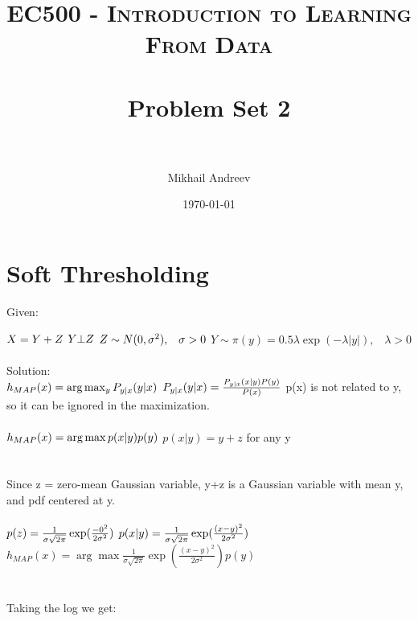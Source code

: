 \documentclass[paper=a4, fontsize=11pt]{scrartcl} %
\title{	
	\normalfont \normalsize 
	\textsc{EC500 - Introduction to Learning From Data} \\ [25pt] %
	\horrule{0.5pt} \\[0.4cm] %
	\huge Problem Set 2 \\ %
	\horrule{2pt} \\[0.5cm] %
}
\author{Mikhail Andreev} %
\date{\normalsize\today} %
\numberwithin{equation}{section} %
\numberwithin{figure}{section} %
\numberwithin{table}{section} %
\begin{document}
	
	\maketitle %
	
	
	\section{Soft Thresholding}
	
	Given:
	
	$X = Y + Z\\$
	$Y \bot Z\\$
	$Z \sim N(0, \sigma^2),\;\;\; \sigma > 0\\$
	$Y \sim \pi(y) = 0.5\lambda\exp(-\lambda|y|),\;\;\; \lambda > 0$
	\\\\
	Solution:\\
	$h_{MAP}(x) = \arg \max_y P_{y|x} (y|x)\\\\$
	$P_{y|x}(y|x) = \frac{P_{y|x}(x|y)P(y)}{P(x)}\\\\$
	p(x) is not related to y, so it can be ignored in the maximization.\\\\
	$h_{MAP}(x) = \arg \max p(x|y)p(y)\\\\$
	$p(x|y) = y + z$ for any y\\\\\\
	Since z = zero-mean Gaussian variable, y+z is a Gaussian variable with mean y, and pdf centered at y.\\\\
	$p(z) = \frac{1}{\sigma\sqrt{2\pi}}\exp(\frac{-0^2}{2\sigma^2})\\\\$
	$p(x|y) = \frac{1}{\sigma\sqrt{2\pi}}\exp(\frac{(x-y)^2}{2\sigma^2})\\\\$
	$h_{MAP}(x) = \arg \max \frac{1}{\sigma\sqrt{2\pi}}\exp(\frac{(x-y)^2}{2\sigma^2}) p(y)$
	\\\\\\Taking the log we get:\\\\
\end{document}
